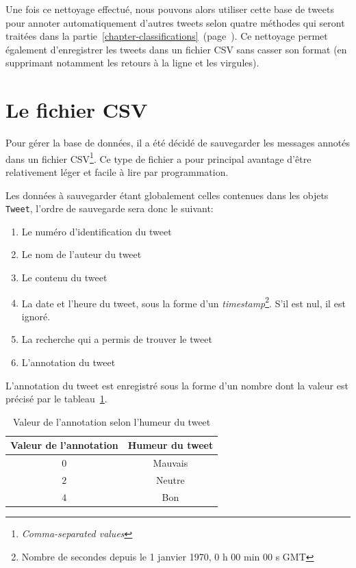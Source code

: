 \documentclass[12pt,a4paper]{report}
\begin{document}
Une fois ce nettoyage effectué, nous pouvons alors utiliser cette base de tweets
pour annoter automatiquement d'autres tweets selon quatre méthodes qui seront
traitées dans la
partie~\ref{chapter-classifications}~(page~\pageref{chapter-classifications}).
Ce nettoyage permet également d'enregistrer les tweets dans un fichier CSV sans
casser son format (en supprimant notamment les retours à la ligne et les
virgules).

\section{Le fichier CSV}

Pour gérer la base de données, il a été décidé de sauvegarder les messages
annotés dans un fichier CSV\footnote{\textit{Comma-separated values}}. Ce type
de fichier a pour principal avantage d'être relativement léger et facile à lire
par programmation.

Les données à sauvegarder étant globalement celles contenues dans les objets
\texttt{Tweet}, l'ordre de sauvegarde sera donc le suivant:

\begin{enumerate}
	\item
		Le numéro d'identification du tweet
	\item
		Le nom de l'auteur du tweet
	\item
		Le contenu du tweet
	\item
		La date et l'heure du tweet, sous la forme d'un
		\textit{timestamp}\footnote{Nombre de secondes depuis le 
		1\ier{} janvier 1970, 0 h 00 min 00 s GMT}. S'il est nul, il est
		ignoré.
	\item
		La recherche qui a permis de trouver le tweet
	\item
		L'annotation du tweet
\end{enumerate}

L'annotation du tweet est enregistré sous la forme d'un nombre dont la valeur
est précisé par le tableau~\ref{tableau-valeurs-annotation}.

\begin{table}[h]
	\centering
	\begin{tabular}{c c}
		\textbf{Valeur de l'annotation}	& \textbf{Humeur du tweet}\\
		\midrule
		$0$				& Mauvais\\
		\midrule
		$2$				& Neutre\\
		\midrule
		$4$				& Bon
	\end{tabular}
	\caption{Valeur de l'annotation selon l'humeur du tweet}
	\label{tableau-valeurs-annotation}
\end{table}
\end{document}
